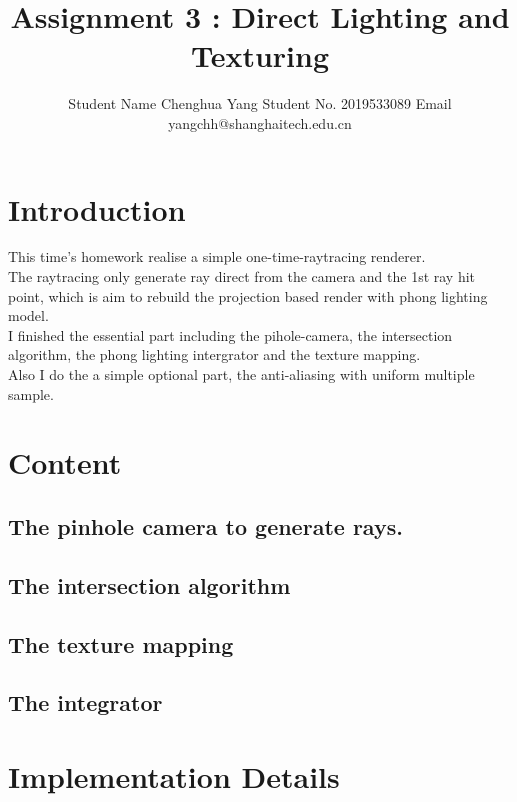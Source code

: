\documentclass[acmtog]{acmart}
\title{Assignment 3 : Direct Lighting and Texturing}
\author{Student Name Chenghua Yang \quad Student No. 2019533089 \quad Email yangchh@shanghaitech.edu.cn}
\begin{document}
\maketitle

\vspace*{2 ex}

\section{Introduction}
	\quad This time's homework realise a simple one-time-raytracing renderer.
	\\\quad The raytracing only generate ray direct from the camera and the 1st ray hit point, which is aim to rebuild the projection based render with phong lighting model.
	\\\quad I finished the essential part including the pihole-camera, the intersection algorithm, the phong lighting intergrator and the texture mapping.
	\\\quad Also I do the a simple optional part, the anti-aliasing with uniform multiple sample.

\section{Content}
	\subsection{The pinhole camera to generate rays.}
	\subsection{The intersection algorithm}
	\subsection{The texture mapping}
	\subsection{The integrator}

\section{Implementation Details}
\end{document}
